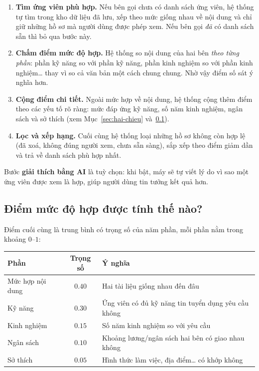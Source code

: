 \documentclass[a4paper,11pt]{article}
\begin{document}
\begin{enumerate}[leftmargin=1.6em]
  \item \textbf{Tìm ứng viên phù hợp.} Nếu bên gọi chưa có danh sách ứng viên, hệ thống
        tự tìm trong kho dữ liệu đã lưu, xếp theo mức giống nhau về nội dung và chỉ giữ
        những hồ sơ mà người dùng được phép xem. Nếu bên gọi \emph{đã} có danh sách sẵn
        thì bỏ qua bước này.
  \item \textbf{Chấm điểm mức độ hợp.} Hệ thống so nội dung của hai bên \emph{theo từng
        phần}: phần kỹ năng so với phần kỹ năng, phần kinh nghiệm so với phần kinh
        nghiệm\dots{} thay vì so cả văn bản một cách chung chung. Nhờ vậy điểm số sát ý
        nghĩa hơn.
  \item \textbf{Cộng điểm chi tiết.} Ngoài mức hợp về nội dung, hệ thống cộng thêm điểm
        theo các yếu tố rõ ràng: mức đáp ứng kỹ năng, số năm kinh nghiệm, ngân sách và
        sở thích (xem Mục~\ref{sec:hai-chieu} và~\ref{subsec:diem}).
  \item \textbf{Lọc và xếp hạng.} Cuối cùng hệ thống loại những hồ sơ không còn hợp lệ
        (đã xoá, không đúng người xem, chưa sẵn sàng), sắp xếp theo điểm giảm dần và trả
        về danh sách phù hợp nhất.
\end{enumerate}

Bước \textbf{giải thích bằng AI} là tuỳ chọn: khi bật, máy sẽ tự viết lý do vì sao một
ứng viên được xem là hợp, giúp người dùng tin tưởng kết quả hơn.



\subsection{Điểm mức độ hợp được tính thế nào?}
\label{subsec:diem}

Điểm cuối cùng là trung bình có trọng số của năm phần, mỗi phần nằm trong khoảng
$0$--$1$:

\begin{center}\small
\begin{tabular}{@{}lc l@{}}
\toprule
\textbf{Phần} & \textbf{Trọng số} & \textbf{Ý nghĩa} \\
\midrule
Mức hợp nội dung & $0.40$ & Hai tài liệu giống nhau đến đâu \\
Kỹ năng          & $0.30$ & Ứng viên có đủ kỹ năng tin tuyển dụng yêu cầu không \\
Kinh nghiệm      & $0.15$ & Số năm kinh nghiệm so với yêu cầu \\
Ngân sách        & $0.10$ & Khoảng lương/ngân sách hai bên có giao nhau không \\
Sở thích         & $0.05$ & Hình thức làm việc, địa điểm\dots{} có khớp không \\
\bottomrule
\end{tabular}
\end{center}
\end{document}
